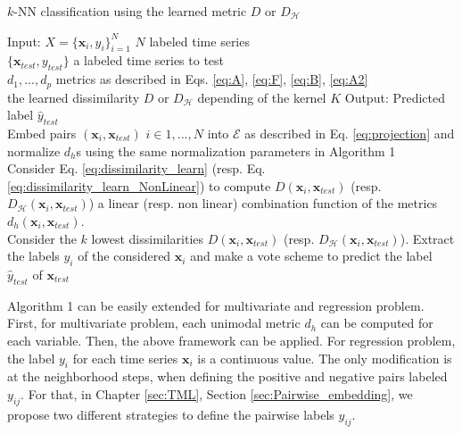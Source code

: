 \begin{algorithm}[h!]
	\begin{algorithmic}[1]
		\caption{$k$-NN classification using the learned metric $D$ or $D_{\mathcal{H}}$}
		\STATE Input:  
		$X=\{\textbf{x}_i, y_i\}_{i=1}^N$ $N$ labeled time series \\
		\hspace{1.1cm} $\{\textbf{x}_{test}, y_{test}\}$ a labeled time series to test \\
		\hspace{1.1cm} $d_1, ...,d_p$  metrics as described in Eqs. \ref{eq:A}, \ref{eq:F}, \ref{eq:B}, \ref{eq:A2} \\
		\hspace{1.1cm} the learned dissimilarity $D$ or $D_{\mathcal{H}}$ depending of the kernel $K$
		\STATE Output: Predicted label $\hat{y}_{test}$
		 \\   
		Embed pairs $(\textbf{x}_i,\textbf{x}_{test})$ $i\in {1,...,N}$ into $\mathcal{E}$ as described in Eq. \ref{eq:projection} and normalize $d_h$s using the same normalization parameters in Algorithm 1
		 \\ 
		Consider Eq. \ref{eq:dissimilarity_learn} (resp. Eq. \ref{eq:dissimilarity_learn_NonLinear}) to compute $D(\textbf{x}_i,\textbf{x}_{test})$ (resp. $D_{\mathcal{H}}(\textbf{x}_i,\textbf{x}_{test})$) a linear (resp. non linear) combination function of the metrics $d_h(\textbf{x}_i,\textbf{x}_{test})$.
		 \\
		Consider the $k$ lowest dissimilarities $D(\textbf{x}_i,\textbf{x}_{test})$ (resp. $D_{\mathcal{H}}(\textbf{x}_i,\textbf{x}_{test})$). Extract the labels $y_i$ of the considered $\textbf{x}_i$ and make a vote scheme to predict the label $\hat{y}_{test}$ of $\textbf{x}_{test}$
	\end{algorithmic}
\end{algorithm}

Algorithm 1 can be easily extended for multivariate and regression problem. First, for multivariate problem, each unimodal metric $d_h$ can be computed for each variable. Then, the above framework can be applied. For regression problem, the label $y_i$ for each time series $\textbf{x}_i$ is a continuous value. The only modification is at the neighborhood steps, when defining the positive and negative pairs labeled $y_{ij}$. For that, in Chapter \ref{sec:TML}, Section \ref{sec:Pairwise_embedding}, we propose two different strategies to define the pairwise labels $y_{ij}$.

